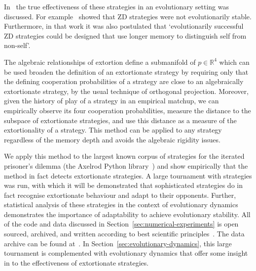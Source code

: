 \documentclass[a4paper]{article}
\begin{document}
In~\cite{adami2013evolutionary, Hilbe2013, hilbe2013adaptive, hilbe2015partners,
ichinose2018zero, Moran1707} the true effectiveness of these strategies in an
evolutionary setting was discussed. For
example~\cite{adami2013evolutionary} showed that ZD strategies were not
evolutionarily stable. Furthermore, in that work it was also postulated that
`evolutionarily successful ZD strategies could be designed that use longer memory
to distinguish self from non-self'.

The algebraic relationships of extortion define a submanifold of
\(p\in\mathbb{R}^4\) which can be used broaden the definition of an extortionate
strategy by requiring only that the defining cooperation probabilities of a
strategy are close to an algebraically extortionate strategy, by the usual
technique of orthogonal projection. Moreover, given the history of play of a
strategy in an empirical matchup, we can empirically observe its four
cooperation probabilities, measure the distance to the subspace of extortionate
strategies, and use this distance as a measure of the extortionality of a
strategy. This method can be applied to any strategy regardless of the memory
depth and avoids the algebraic rigidity issues.

We apply this method to the largest known corpus of strategies for the iterated
prisoner's dilemma (the Axelrod Python library~\cite{Knight2016, Knight2018})
and show empirically that the method in fact detects extortionate strategies.
A large tournament with 
strategies was run, with which it will be demonstrated that sophisticated
strategies do in fact recognise extortionate behaviour and adapt to their
opponents. Further, statistical analysis of these strategies in the context of
evolutionary dynamics demonstrates the importance of adaptability to achieve
evolutionary stability. All of the code and data discussed in
Section~\ref{sec:numerical-experiments} is open sourced, archived, and written
according to best scientific principles~\cite{Wilson2014}. The data archive can
be found at~\cite{vincent_knight_2018_1297075}. In
Section~\ref{sec:evolutionary-dynamics}, this large tournament is complemented
with evolutionary dynamics that offer some insight in to the
effectiveness of extortionate strategies.
\end{document}
